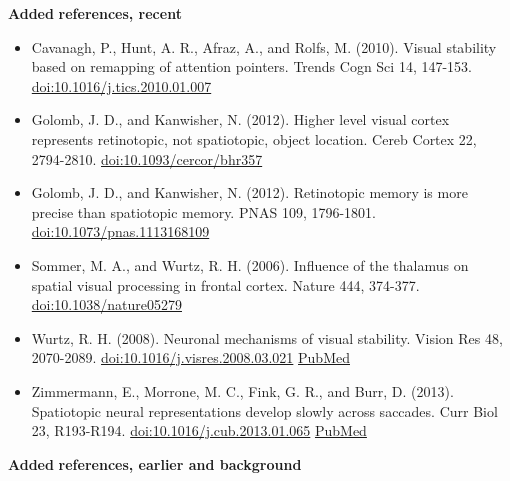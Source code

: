 \documentclass[11pt,a4paper]{article}
\begin{document}
\textbf{Added }\textbf{references, recent}

\begin{itemize}[itemsep=2pt,topsep=2pt]
\item Cavanagh, P., Hunt, A. R., Afraz, A., and Rolfs, M. (2010). Visual stability based on remapping of attention pointers. Trends Cogn Sci 14, 147-153. \href{https://doi.org/10.1016/j.tics.2010.01.007}{doi:10.1016/j.tics.2010.01.007}
\item Golomb, J. D., and Kanwisher, N. (2012). Higher level visual cortex represents retinotopic, not spatiotopic, object location. Cereb Cortex 22, 2794-2810. \href{https://doi.org/10.1093/cercor/bhr357}{doi:10.1093/cercor/bhr357}
\item Golomb, J. D., and Kanwisher, N. (2012). Retinotopic memory is more precise than spatiotopic memory. PNAS 109, 1796-1801. \href{https://doi.org/10.1073/pnas.1113168109}{doi:10.1073/pnas.1113168109}
\item Sommer, M. A., and Wurtz, R. H. (2006). Influence of the thalamus on spatial visual processing in frontal cortex. Nature 444, 374-377. \href{https://doi.org/10.1038/nature05279}{doi:10.1038/nature05279}
\item Wurtz, R. H. (2008). Neuronal mechanisms of visual stability. Vision Res 48, 2070-2089. \href{https://doi.org/10.1016/j.visres.2008.03.021}{doi:10.1016/j.visres.2008.03.021} \href{https://pubmed.ncbi.nlm.nih.gov/18513781/}{PubMed}
\item Zimmermann, E., Morrone, M. C., Fink, G. R., and Burr, D. (2013). Spatiotopic neural representations develop slowly across saccades. Curr Biol 23, R193-R194. \href{https://doi.org/10.1016/j.cub.2013.01.065}{doi:10.1016/j.cub.2013.01.065} \href{https://pubmed.ncbi.nlm.nih.gov/23473558/}{PubMed}
\end{itemize}

\textbf{Added }\textbf{references, earlier and background}
\end{document}
